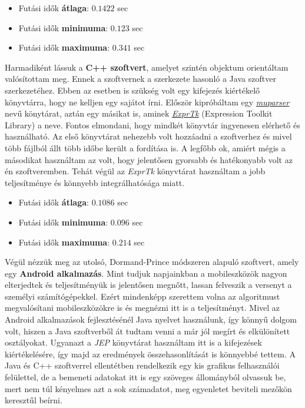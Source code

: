 \begin{itemize}
	\item Futási idők \textbf{átlaga}: $ 0.1422 $ sec
	\item Futási idők \textbf{minimuma}: $ 0.123 $ sec
	\item Futási idők \textbf{maximuma}: $ 0.341 $ sec
\end{itemize}

Harmadiként lássuk a \textbf{C++ szoftvert}, amelyet szintén objektum orientáltam valósítottam meg. Ennek a szoftvernek a szerkezete hasonló a Java szoftver szerkezetéhez. Ebben az esetben is szükség volt egy kifejezés kiértékelő könyvtárra, hogy ne kelljen egy sajátot írni. Először kipróbáltam egy \href{http://beltoforion.de/article.php?a=muparser}{\textit{muparser}} nevű könytárat, aztán egy másikat is, aminek \href{https://exprtk.codeplex.com/}{\textit{ExprTk}} (Expression Toolkit Library) a neve. Fontos elmondani, hogy mindkét könyvtár ingyenesen elérhető és használható. Az első könyvtárat nehezebb volt hozzáadni a szoftverhez és mivel több fájlból állt több időbe került a fordítása is. A legfőbb ok, amiért mégis a másodikat használtam az volt, hogy jelentősen gyorsabb és hatékonyabb volt az én szoftveremben. Tehát végül az \textit{ExprTk} könyvtárat használtam a jobb teljesítménye és könnyebb integrálhatósága miatt.


\begin{itemize}
	\item Futási idők \textbf{átlaga}: $ 0.1086 $ sec
	\item Futási idők \textbf{minimuma}: $ 0.096 $ sec
	\item Futási idők \textbf{maximuma}: $ 0.214 $ sec
\end{itemize}

Végül nézzük meg az utolsó, Dormand-Prince módszeren alapuló szoftvert, amely egy \textbf{Android alkalmazás}. Mint tudjuk napjainkban a mobileszközök nagyon elterjedtek és teljesítményük is jelentősen megnőtt, lassan felveszik a versenyt a személyi számítógépekkel. Ezért mindenképp szerettem volna az algoritmust megvalósítani mobileszközökre is és megnézni itt is a teljesítményt. Mivel az Android alkalmazások fejlesztésénél Java nyelvet használunk, így könnyű dolgom volt, hiszen a Java szoftverből át tudtam venni a már jól megírt és elkülönített osztályokat. Ugyanazt a \textit{JEP} könyvtárat használtam itt is a kifejezések kiértékelésére, így majd az eredmények összehasonlítását is könnyebbé tettem. A Java és C++ szoftverrel ellentétben rendelkezik egy kis grafikus felhasználói felülettel, de a bemeneti adatokat itt is egy szöveges állományból olvassuk be, mert nem túl kényelmes azt a sok számadatot, meg egyenletet beviteli mezőkön keresztűl beírni.


